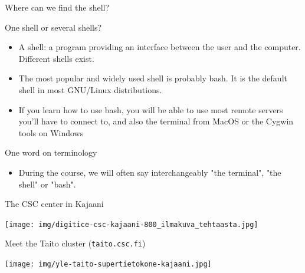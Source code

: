 \documentclass[big]{beamer}
\begin{document}
\begin{frame}[label=sec-2-3]{Where can we find the shell?}
\begin{block}{One shell or several shells?}
\begin{itemize}
\item A shell: a program providing an \alert{interface} between the user and the
computer. \alert{Different shells exist}.
\item The most popular and widely used shell is probably \alert{bash}. It is the
default shell in most GNU/Linux distributions.
\item If you learn how to use \alert{bash}, you will be able to use most \alert{remote servers}
you'll have to connect to, and also the \alert{terminal} from MacOS or the \alert{Cygwin}
tools on Windows
\end{itemize}
\end{block}
\begin{block}{One word on terminology}
\begin{itemize}
\item During the course, we will often say interchangeably "the terminal", "the
shell" or "bash".
\end{itemize}
\end{block}
\end{frame}
\begin{frame}[label=sec-2-4]{The CSC center in Kajaani}
\begin{center}
\texttt{[image: img/digitice-csc-kajaani-800\_ilmakuva\_tehtaasta.jpg]}
\end{center}
\end{frame}
\begin{frame}[fragile,label=sec-2-5]{Meet the Taito cluster (\texttt{taito.csc.fi})}
 \begin{center}
\texttt{[image: img/yle-taito-supertietokone-kajaani.jpg]}
\end{center}
\end{frame}
\end{document}
